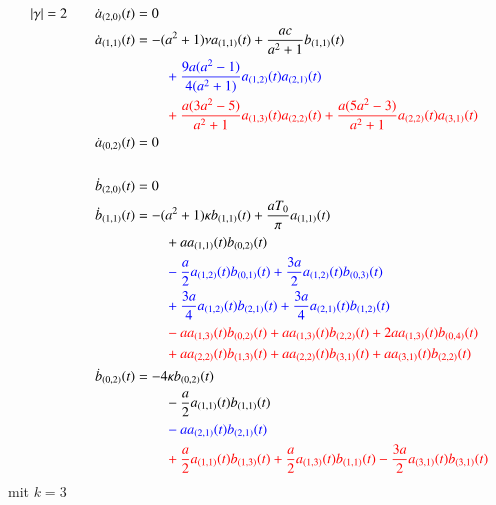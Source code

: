 \begin{align*}
|\gamma| = 2
\qquad &
\dot{a}_{(2,0)}(t) = 0
\\
&
\dot{a}_{(1,1)}(t)
=
-
(a^2+1)
\nu
a_{(1,1)}(t)
+
\frac{a c}{a^2+1} b_{(1,1)}(t)
\\
&\phantom{aaaaaaaaaa}
\color{blue}
+
\frac{9 a (a^2 - 1)}{4 (a^2+1)} a_{(1,2)}(t) a_{(2,1)}(t)
\\
&\phantom{aaaaaaaaaa}
\color{red}
+
\frac{a (3 a^2 - 5)}{a^2+1} a_{(1,3)}(t) a_{(2,2)}(t)
+
\frac{a (5 a^2 - 3)}{a^2+1} a_{(2,2)}(t) a_{(3,1)}(t)
\\
&
\dot{a}_{(0,2)}(t) = 0
\\
\\
&
\dot{b}_{(2,0)}(t) = 0
\\
&
\dot{b}_{(1,1)}(t)
=
-
(a^2+1)
\kappa
b_{(1,1)}(t)
+
\frac{a T_{0}}{\pi} a_{(1,1)}(t)
\\
&\phantom{aaaaaaaaaa}
+
a
a_{(1,1)}(t) b_{(0,2)}(t)
\\
&\phantom{aaaaaaaaaa}
\color{blue}
-
\frac{a}{2} a_{(1,2)}(t) b_{(0,1)}(t)
+
\frac{3 a}{2} a_{(1,2)}(t) b_{(0,3)}(t)
\\
&\phantom{aaaaaaaaaa}
\color{blue}
+
\frac{3 a}{4} a_{(1,2)}(t) b_{(2,1)}(t)
+
\frac{3 a}{4} a_{(2,1)}(t) b_{(1,2)}(t)
\\
&\phantom{aaaaaaaaaa}
\color{red}
-
a
a_{(1,3)}(t) b_{(0,2)}(t)
+
a
a_{(1,3)}(t) b_{(2,2)}(t)
+
2 a
a_{(1,3)}(t) b_{(0,4)}(t)
\\
&\phantom{aaaaaaaaaa}
\color{red}
+
a
a_{(2,2)}(t) b_{(1,3)}(t)
+
a
a_{(2,2)}(t) b_{(3,1)}(t)
+
a
a_{(3,1)}(t) b_{(2,2)}(t)
\\
&
\dot{b}_{(0,2)}(t)
=
-
4
\kappa
b_{(0,2)}(t)
\\
&\phantom{aaaaaaaaaa}
-
\frac{a}{2} a_{(1,1)}(t) b_{(1,1)}(t)
\\
&\phantom{aaaaaaaaaa}
\color{blue}
-
a
a_{(2,1)}(t) b_{(2,1)}(t)
\\
&\phantom{aaaaaaaaaa}
\color{red}
+
\frac{a}{2} a_{(1,1)}(t) b_{(1,3)}(t)
+
\frac{a}{2} a_{(1,3)}(t) b_{(1,1)}(t)
-
\frac{3 a}{2} a_{(3,1)}(t) b_{(3,1)}(t)
\end{align*}
mit $k = 3$
